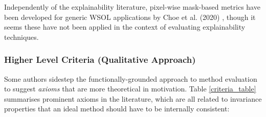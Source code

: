 \documentclass[main]{subfiles}
\begin{document}
Independently of the explainability literature, pixel-wise mask-based metrics have been developed for generic WSOL applications by Choe et al. (2020)  \cite{choe}, though it seems these have not been applied in the context of evaluating explainability techniques.

\subsubsection{Higher Level Criteria (Qualitative Approach)}

Some authors sidestep the functionally-grounded approach to method evaluation to suggest \textit{axioms} that are more theoretical in motivation. Table \ref{criteria_table} summarises prominent axioms in the literature, which are all related to invariance properties that an ideal method should have to be internally consistent:
\end{document}
